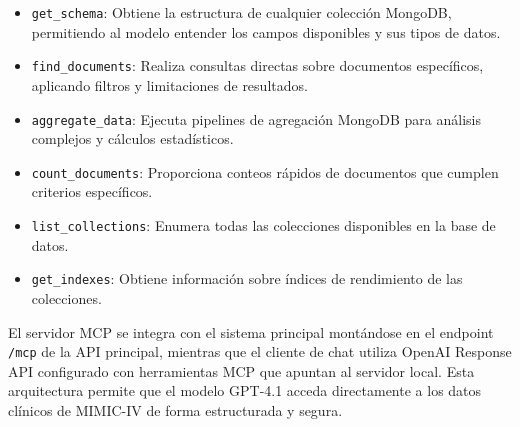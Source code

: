 \begin{itemize}
\item \texttt{get\_schema}: Obtiene la estructura de cualquier colección MongoDB, permitiendo al modelo entender los campos disponibles y sus tipos de datos.
\item \texttt{find\_documents}: Realiza consultas directas sobre documentos específicos, aplicando filtros y limitaciones de resultados.
\item \texttt{aggregate\_data}: Ejecuta pipelines de agregación MongoDB para análisis complejos y cálculos estadísticos.
\item \texttt{count\_documents}: Proporciona conteos rápidos de documentos que cumplen criterios específicos.
\item \texttt{list\_collections}: Enumera todas las colecciones disponibles en la base de datos.
\item \texttt{get\_indexes}: Obtiene información sobre índices de rendimiento de las colecciones.
\end{itemize}

El servidor MCP se integra con el sistema principal montándose en el endpoint \texttt{/mcp} de la API principal, mientras que el cliente de chat utiliza OpenAI Response API configurado con herramientas MCP que apuntan al servidor local. Esta arquitectura permite que el modelo GPT-4.1 acceda directamente a los datos clínicos de MIMIC-IV de forma estructurada y segura.







